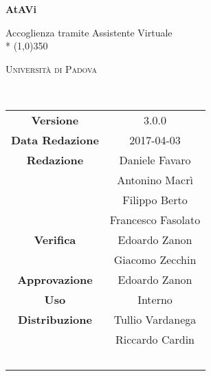 \documentclass[a4paper,12pt]{article}
\date{2017/04/03}
\begin{document}
\begin{titlepage}
	\centering
	{\huge\bfseries AtAVi\par}
	Accoglienza tramite Assistente Virtuale \\*
	\line(1,0){350} \\
	{\scshape\LARGE Università di Padova \par}
	\vspace{1cm}
	{\scshape\Large \normediprogettoRQ\ \par}
	\logo
	\newpage
	\begin{tabular}{c|c}
		{\hfill \textbf{Versione}} 			& 3.0.0								\\
		{\hfill\textbf{Data Redazione}} 	& 2017-04-03 						\\
		{\hfill\textbf{Redazione}} 			& Daniele Favaro \\ & Antonino Macrì \\ & Filippo Berto \\ & Francesco Fasolato \\
		{\hfill\textbf{Verifica}} 			& Edoardo Zanon \\ & Giacomo Zecchin				\\
		{\hfill\textbf{Approvazione}} 		& Edoardo Zanon	\\
		{\hfill\textbf{Uso}} 				& Interno 							\\
		{\hfill\textbf{Distribuzione}} 		& Tullio Vardanega \\ & Riccardo Cardin \\ & \prop\	\\
	\end{tabular}
\end{titlepage}
	
	\pagestyle{myfront}
	\newpage
		
	\newpage
		\tableofcontents
	
	\label{LastFrontPage}	
		\newpage	
		\pagestyle{mymain}		
			
		\newpage
			
		\newpage		
			
		\newpage		
			
		
	\label{LastPage}
\end{document}
